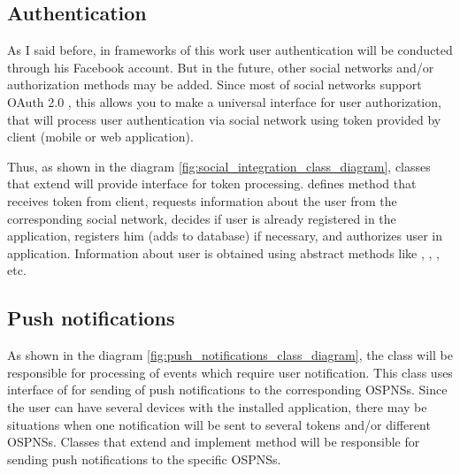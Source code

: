 \subsection{Authentication}
As I said before, in frameworks of this work user authentication will be conducted through his Facebook account. But
in the future, other social networks and/or authorization methods may be added. Since most of social networks support
OAuth 2.0 \cite{oauth}, this allows you to make a universal interface for user authorization, that will process
user authentication via social network using token provided by client (mobile or web application).

Thus, as shown in the diagram \ref{fig:social_integration_class_diagram}, classes that extend 
will provide interface for token processing.  defines method  that receives
token from client, requests information about the user from the corresponding social network, decides if user is already
registered in the application, registers him (adds to database) if necessary, and authorizes user in application.
Information about user is obtained using abstract methods like , ,
, etc.



\subsection{Push notifications}
As shown in the diagram \ref{fig:push_notifications_class_diagram}, the  class will be responsible
for processing of events which require user notification. This class uses interface of 
for sending of push notifications to the corresponding \ac{OSPNS}s. Since the user can have several devices with the
installed application, there may be situations when one notification will be sent to several tokens and/or different
\ac{OSPNS}s. Classes that extend  and implement method  will be
responsible for sending push notifications to the specific \ac{OSPNS}s.



